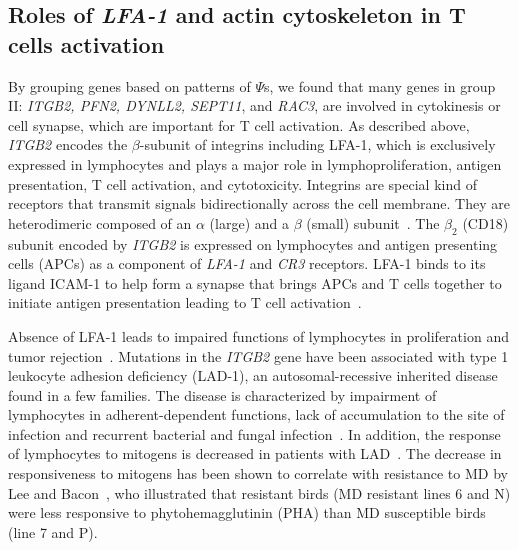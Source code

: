 \subsection{Roles of {\em LFA-1} and actin cytoskeleton in T
cells activation}

By grouping genes based on patterns of $\Psi$s, we found that many
genes in group II: {\em ITGB2, PFN2, DYNLL2, SEPT11}, and {\em
RAC3}, are involved in cytokinesis or cell synapse, which are
important for T cell activation.  As described above, {\em ITGB2}
encodes the $\beta$-subunit of integrins including LFA-1, which is
exclusively expressed in lymphocytes and plays a major role in
lymphoproliferation, antigen presentation, T cell activation, and
cytotoxicity.  Integrins are special kind of receptors that transmit
signals bidirectionally across the cell membrane.  They are
heterodimeric composed of an $\alpha$ (large) and a $\beta$ (small)
subunit~\cite{wang2010immunopathologies}.  The $\beta_{2}$ (CD18)
subunit encoded by {\em ITGB2} is expressed on lymphocytes and antigen
presenting cells (APCs) as a component of {\em LFA-1} and {\em CR3}
receptors.  LFA-1 binds to its ligand ICAM-1 to help form a synapse
that brings APCs and T cells together to initiate antigen presentation
leading to T cell activation~\cite{dustin2000immunological}.

Absence of LFA-1 leads to impaired functions of lymphocytes in
proliferation and tumor
rejection~\cite{scharffetter1998spontaneous,schmits1996lfa}.
Mutations in the {\em ITGB2} gene have been associated with type 1
leukocyte adhesion deficiency (LAD-1), an autosomal-recessive
inherited disease found in a few families.  The disease is
characterized by impairment of lymphocytes in adherent-dependent
functions, lack of accumulation to the site of infection and recurrent
bacterial and fungal infection~\cite{springer1987lymphocyte}.  In
addition, the response of lymphocytes to mitogens is decreased in
patients with LAD~\cite{springer1987lymphocyte}.  The decrease in
responsiveness to mitogens has been shown to correlate with resistance
to MD by Lee and Bacon~\cite{lee1983ontogeny}, who illustrated that
resistant birds (MD resistant lines 6 and N) were less responsive to
phytohemagglutinin (PHA) than MD susceptible birds (line 7 and P).

